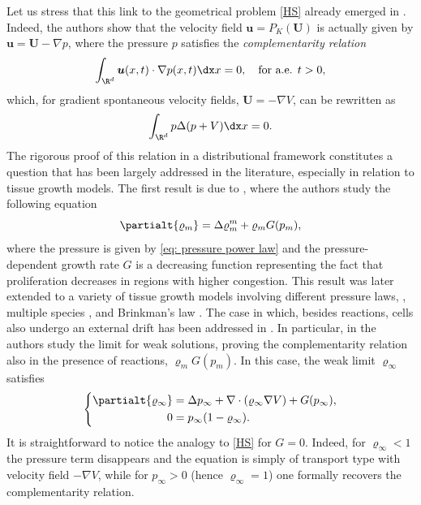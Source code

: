 Let us stress that this link to the geometrical problem \eqref{HS} already emerged in \cite{MRSV2011}. Indeed, the authors show that the velocity field $\boldsymbol{u}=P_K(\boldsymbol{U})$ is actually given by $\boldsymbol{u}=\boldsymbol{U}-\nabla p$, where the pressure $p$ satisfies the \textit{complementarity relation}
\[
\int_{\R^d} \boldsymbol{u}(x,t)\cdot \nabla p(x,t) \dx x=0, \quad\text{for a.e. } t>0,
\]
which, for gradient spontaneous velocity fields, $\boldsymbol{U}=-\nabla V$, can be rewritten as
\[
\int_{\R^d} p \Delta (p+V)\dx x=0.
\]
The rigorous proof of this relation in a distributional framework constitutes a question that has been largely addressed in the literature, especially in relation to tissue growth models. The first result is due to \cite{PQV}, where the authors study the following equation
\begin{equation}\label{pqv}
\partialt{\varrho_m} = \Delta \varrho_m^m + \varrho_m G(p_m),
\end{equation}
where the pressure is given by \eqref{eq: pressure power law} and the pressure-dependent growth rate $G$ is a decreasing function representing the fact that proliferation decreases in regions with higher congestion.
This result was later extended to a variety of tissue growth models involving different pressure laws, \cite{hecht2017incompressible, DHV}, multiple species \cite{BPPS, LX2021}, and Brinkman's law \cite{PV, DeSc, DEBIEC2020}. The case in which, besides reactions, cells also undergo an external drift has been addressed in \cite{KPW19, DS21}. In particular, in \cite{DS21} the authors study the limit for weak solutions, proving the complementarity relation also in the presence of reactions, $\varrho_m G(p_m)$.
In this case, the weak limit $\varrho_\infty$ satisfies
\begin{equation}\label{eq: limit}
\left\{
\begin{aligned}
\partialt{\varrho_\infty} &=\Delta p_\infty +\nabla \cdot(\varrho_\infty\nabla V) + G(p_\infty),\\
0&=p_\infty(1-\varrho_\infty).
\end{aligned}
\right.
\end{equation}
It is straightforward to notice the analogy to \eqref{HS} for $G=0$. Indeed, for \hbox{$\varrho_\infty<1$} the pressure term disappears and the equation is simply of transport type with velocity field $-\nabla V$, while for $p_\infty>0$ (hence $\varrho_\infty=1$) one formally recovers the complementarity relation.

